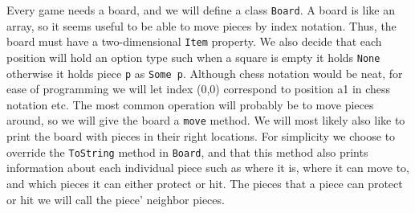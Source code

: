 %
Every game needs a board, and we will define a class \lstinline{Board}. A board is like an array, so it seems useful to be able to move pieces by index notation. Thus, the board must have a two-dimensional \lstinline{Item} property. We also decide that each position will hold an option type such when a square is empty it holds \lstinline{None} otherwise it holds piece \lstinline{p} as \lstinline{Some p}. Although chess notation would be neat, for ease of programming we will let index (0,0) correspond to position a1 in chess notation etc. The most common operation will probably be to move pieces around, so we will give the board a \lstinline{move} method. We will most likely also like to print the board with pieces in their right locations. For simplicity we choose to override the \lstinline{ToString} method in \lstinline{Board}, and that this method also prints information about each individual piece such as where it is, where it can move to, and which pieces it can either protect or hit. The pieces that a piece can protect or hit we will call the piece' neighbor pieces.

